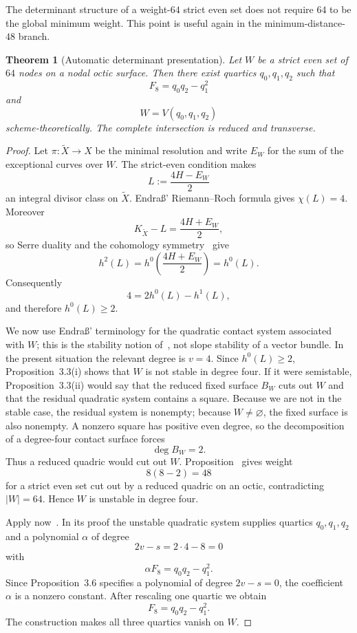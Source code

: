 \documentclass[11pt,reqno]{amsart}
\newtheorem{theorem}{Theorem}[section]
\theoremstyle{remark}
\begin{document}
The determinant structure of a weight-$64$ strict even set does not require $64$ to be the global minimum weight.  This point is useful again in the minimum-distance-$48$ branch.

\begin{theorem}[Automatic determinant presentation]\label{thm:det64}
Let $W$ be a strict even set of $64$ nodes on a nodal octic surface.  Then there exist quartics $q_0,q_1,q_2$ such that
\[
F_8=q_0q_2-q_1^2
\]
and
\[
W=V(q_0,q_1,q_2)
\]
scheme-theoretically.  The complete intersection is reduced and transverse.
\end{theorem}

\begin{proof}
Let $\pi:\widetilde X\to X$ be the minimal resolution and write $E_W$ for the sum of the exceptional curves over $W$.  The strict-even condition makes
\[
L:=\frac{4H-E_W}{2}
\]
an integral divisor class on $\widetilde X$.  Endra\ss' Riemann--Roch formula gives $\chi(L)=4$.  Moreover
\[
K_{\widetilde X}-L=\frac{4H+E_W}{2},
\]
so Serre duality and the cohomology symmetry~\cite[Lem.~4.1]{EndrassMinimal} give
\[
h^2(L)=h^0\!\left(\frac{4H+E_W}{2}\right)=h^0(L).
\]
Consequently
\[
4=2h^0(L)-h^1(L),
\]
and therefore $h^0(L)\ge2$.

We now use Endra\ss' terminology for the quadratic contact system associated with $W$; this is the stability notion of~\cite[Def.~3.1 and Prop.~3.3]{EndrassMinimal}, not slope stability of a vector bundle.  In the present situation the relevant degree is $v=4$.  Since $h^0(L)\ge2$, Proposition~3.3(i) shows that $W$ is not stable in degree four.  If it were semistable, Proposition~3.3(ii) would say that the reduced fixed surface $B_W$ cuts out $W$ and that the residual quadratic system contains a square.  Because we are not in the stable case, the residual system is nonempty; because $W\ne\varnothing$, the fixed surface is also nonempty.  A nonzero square has positive even degree, so the decomposition of a degree-four contact surface forces
\[
\deg B_W=2.
\]
Thus a reduced quadric would cut out $W$.  Proposition~\cite[Prop.~3.8]{EndrassMinimal} gives weight
\[
8(8-2)=48
\]
for a strict even set cut out by a reduced quadric on an octic, contradicting $|W|=64$.  Hence $W$ is unstable in degree four.

Apply now~\cite[Prop.~3.6]{EndrassMinimal}.  In its proof the unstable quadratic system supplies quartics $q_0,q_1,q_2$ and a polynomial $\alpha$ of degree
\[
2v-s=2\cdot4-8=0
\]
with
\[
\alpha F_8=q_0q_2-q_1^2.
\]
Since Proposition~3.6 specifies a polynomial of degree $2v-s=0$, the coefficient $\alpha$ is a nonzero constant.  After rescaling one quartic we obtain
\[
F_8=q_0q_2-q_1^2.
\]
The construction makes all three quartics vanish on $W$.


\end{proof}
\end{document}
